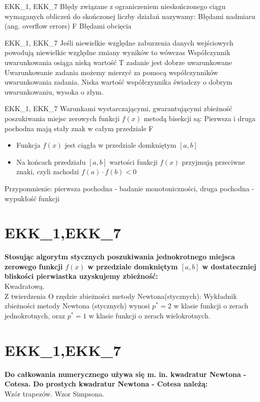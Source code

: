 \answer
{EKK\_1, EKK\_7 Błędy związane z ograniczeniem nieskończonego ciągu wymaganych obliczeń do skończonej liczby działań nazywamy:}
{Błędami nadmiaru (ang. overflow errors)}
{F}
{Błędami obcięcia}
{ }

\answer
{EKK\_1, EKK\_7 Jeśli niewielkie względne zaburzenia danych wejściowych powodują niewielkie względne zmiany wyników to wówczas}
{Współczynnik uwarunkowania osiąga niską wartość}
{T}
{zadanie jest dobrze uwarunkowane}
{Uwarunkowanie zadania możemy mierzyć za pomocą współczynników uwarunkowania zadania. Niska wartość współczynnika świadczy o dobrym uwarunkowaniu, wysoka o złym.}

\answer
{EKK\_1, EKK\_7 Warunkami wystarczającymi, gwarantującymi zbieżność poszukiwania miejsc zerowych funkcji $f(x)$ metodą bisekcji są:}
{Pierwsza i druga pochodna mają stały znak w całym przedziale}
{F}
{\begin{itemize}
\item Funkcja $f(x)$ jest ciągła w przedziale domkniętym $[a,b]$
\item Na końcach przedziału $[a,b]$ wartości funkcji $f(x)$ przyjmują przeciwne znaki, czyli zachodzi 
$f(a)\cdot f(b)<0$
\end{itemize}}
{Przypomnienie: pierwsza pochodna - badanie monotoniczności, druga pochodna - wypukłość funkcji}

\section{EKK\_1,EKK\_7}
\textbf{Stosując algorytm stycznych poszukiwania jednokrotnego miejsca zerowego funkcji $f(x)$ w przedziale domkniętym $[a, b]$ w dostateczniej bliskości pierwiastka uzyskujemy zbieżność:} \\
\vspace{0.4cm}
\noindent  Kwadratową. \\ Z twierdzenia O rzędzie zbieżności metody Newtona(stycznych): Wykładnik zbieżności metody Newtona (stycznych) wynosi $p^*=2$ w klasie funkcji o zerach jednokrotnych, oraz $p^*=1$ w klasie funkcji o zerach wielokrotnych.

\section{EKK\_1,EKK\_7}
\textbf{Do całkowania numerycznego używa się m. in. kwadratur Newtona - Cotesa. Do prostych kwadratur Newtona - Cotesa należą:} \\
\vspace{0.4cm}
\noindent  Wzór trapezów. Wzor Simpsona. 

